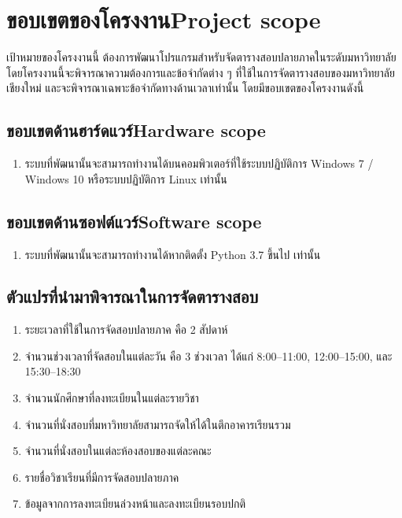 \section{\ifcpe ขอบเขตของโครงงาน\else Project scope\fi}
เป้าหมายของโครงงานนี้ ต้องการพัฒนาโปรแกรมสำหรับจัดตารางสอบปลายภาคในระดับมหาวิทยาลัย
โดยโครงงานนี้จะพิจารณาความต้องการและข้อจำกัดต่าง ๆ ที่ใช้ในการจัดตารางสอบของมหาวิทยาลัยเชียงใหม่
และจะพิจารณาเฉพาะข้อจำกัดทางด้านเวลาเท่านั้น โดยมีขอบเขตของโครงงานดังนี้ 
\subsection{\ifcpe ขอบเขตด้านฮาร์ดแวร์\else Hardware scope\fi}
\begin{enumerate}
    \item ระบบที่พัฒนานั้นจะสามารถทำงานได้บนคอมพิวเตอร์ที่ใช้ระบบปฏิบัติการ Windows 7 / Windows 10 หรือระบบปฏิบัติการ Linux เท่านั้น
\end{enumerate}
\subsection{\ifcpe ขอบเขตด้านซอฟต์แวร์\else Software scope\fi}
\begin{enumerate}
    \item ระบบที่พัฒนานั้นจะสามารถทำงานได้หากติดตั้ง Python 3.7 ขึ้นไป เท่านั้น 
\end{enumerate}
\subsection{ตัวแปรที่นำมาพิจารณาในการจัดตารางสอบ}
\begin{enumerate}
    \item ระยะเวลาที่ใช้ในการจัดสอบปลายภาค คือ 2 สัปดาห์
    \item จำนวนช่วงเวลาที่จัดสอบในแต่ละวัน คือ 3 ช่วงเวลา ได้แก่ 8:00--11:00, 12:00--15:00, 
    และ 15:30--18:30
    \item จำนวนนักศึกษาที่ลงทะเบียนในแต่ละรายวิชา
    \item จำนวนที่นั่งสอบที่มหาวิทยาลัยสามารถจัดให้ได้ในตึกอาคารเรียนรวม
    \item จำนวนที่นั่งสอบในแต่ละห้องสอบของแต่ละคณะ
    \item รายชื่อวิชาเรียนที่มีการจัดสอบปลายภาค
    \item ข้อมูลจากการลงทะเบียนล่วงหน้าและลงทะเบียนรอบปกติ
\end{enumerate}

